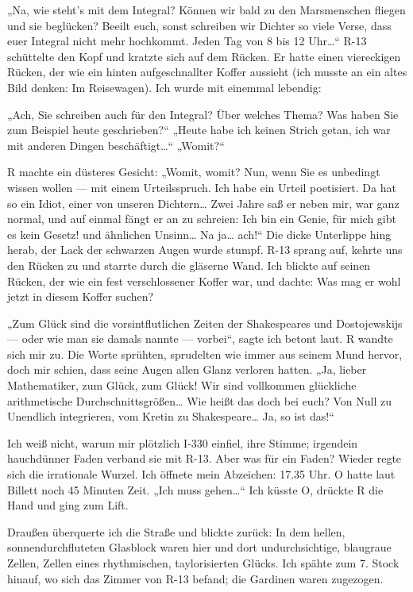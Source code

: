 „Na, wie steht's mit dem Integral? Können wir bald zu den
Marsmenschen fliegen und sie beglücken? Beeilt euch, sonst
schreiben wir Dichter so viele Verse, dass euer Integral nicht mehr
hochkommt. Jeden Tag von 8 bis 12 Uhr\ldots{}“ R-13 schüttelte den Kopf
und kratzte sich auf dem Rücken. Er hatte einen viereckigen Rücken,
der wie ein hinten aufgeschnallter Koffer aussieht (ich musste an
ein altes Bild denken: Im Reisewagen). Ich wurde mit einemmal
lebendig:

„Ach, Sie schreiben auch für den Integral? Über welches Thema? Was
haben Sie zum Beispiel heute geschrieben?“ „Heute habe ich keinen
Strich getan, ich war mit anderen Dingen beschäftigt\ldots{}“ „Womit?“

R machte ein düsteres Gesicht: „Womit, womit? Nun, wenn Sie es
unbedingt wissen wollen — mit einem Urteilsspruch. Ich habe ein
Urteil poetisiert. Da hat so ein Idiot, einer von unseren
Dichtern\ldots{} Zwei Jahre saß er neben mir, war ganz normal, und auf
einmal fängt er an zu schreien: \glq{}Ich bin ein Genie,
für mich gibt es kein Gesetz!{}\grq{} und ähnlichen Unsinn\ldots{} Na
ja\ldots{} ach!“ Die dicke Unterlippe hing herab, der Lack der schwarzen
Augen wurde stumpf. R-13 sprang auf, kehrte uns den Rücken zu und
starrte durch die gläserne Wand. Ich blickte auf seinen Rücken, der
wie ein fest verschlossener Koffer war, und dachte: Was mag er wohl
jetzt in diesem Koffer suchen?

„Zum Glück sind die vorsintflutlichen Zeiten der Shakespeares und
Dostojewskijs — oder wie man sie damals nannte — vorbei“, sagte ich
betont laut. R wandte sich mir zu. Die Worte sprühten, sprudelten
wie immer aus seinem Mund hervor, doch mir schien, dass seine Augen
allen Glanz verloren hatten. „Ja, lieber Mathematiker, zum Glück,
zum Glück! Wir sind vollkommen glückliche arithmetische
Durchschnittsgrößen\ldots{} Wie heißt das doch bei euch? Von Null zu
Unendlich integrieren, vom Kretin zu Shakespeare\ldots{} Ja, so ist
das!“

Ich weiß nicht, warum mir plötzlich I-330 einfiel, ihre Stimme;
irgendein hauchdünner Faden verband sie mit R-13. Aber was für ein
Faden? Wieder regte sich die irrationale Wurzel. Ich öffnete mein
Abzeichen: 17.35 Uhr. O hatte laut Billett noch 45 Minuten Zeit.
„Ich muss gehen\ldots{}“ Ich küsste O, drückte R die Hand und ging zum
Lift.

Draußen überquerte ich die Straße und blickte zurück: In dem
hellen, sonnendurchfluteten Glasblock waren hier und dort
undurchsichtige, blaugraue Zellen, Zellen eines rhythmischen,
taylorisierten Glücks. Ich spähte zum 7. Stock hinauf, wo sich das
Zimmer von R-13 befand; die Gardinen waren zugezogen.

